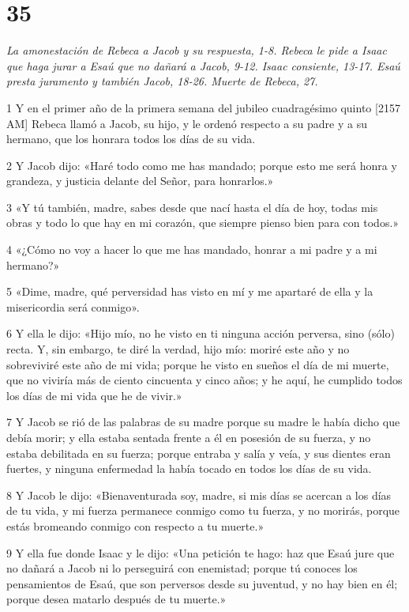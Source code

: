 \chapter{35}

\par \textit{La amonestación de Rebeca a Jacob y su respuesta, 1-8. Rebeca le pide a Isaac que haga jurar a Esaú que no dañará a Jacob, 9-12. Isaac consiente, 13-17. Esaú presta juramento y también Jacob, 18-26. Muerte de Rebeca, 27.}

\par 1 Y en el primer año de la primera semana del jubileo cuadragésimo quinto [2157 AM] Rebeca llamó a Jacob, su hijo, y le ordenó respecto a su padre y a su hermano, que los honrara todos los días de su vida.
\par 2 Y Jacob dijo: «Haré todo como me has mandado; porque esto me será honra y grandeza, y justicia delante del Señor, para honrarlos.»
\par 3 «Y tú también, madre, sabes desde que nací hasta el día de hoy, todas mis obras y todo lo que hay en mi corazón, que siempre pienso bien para con todos.»
\par 4 «¿Cómo no voy a hacer lo que me has mandado, honrar a mi padre y a mi hermano?»
\par 5 «Dime, madre, qué perversidad has visto en mí y me apartaré de ella y la misericordia será conmigo».
\par 6 Y ella le dijo: «Hijo mío, no he visto en ti ninguna acción perversa, sino (sólo) recta. Y, sin embargo, te diré la verdad, hijo mío: moriré este año y no sobreviviré este año de mi vida; porque he visto en sueños el día de mi muerte, que no viviría más de ciento cincuenta y cinco años; y he aquí, he cumplido todos los días de mi vida que he de vivir.»
\par 7 Y Jacob se rió de las palabras de su madre porque su madre le había dicho que debía morir; y ella estaba sentada frente a él en posesión de su fuerza, y no estaba debilitada en su fuerza; porque entraba y salía y veía, y sus dientes eran fuertes, y ninguna enfermedad la había tocado en todos los días de su vida.
\par 8 Y Jacob le dijo: «Bienaventurada soy, madre, si mis días se acercan a los días de tu vida, y mi fuerza permanece conmigo como tu fuerza, y no morirás, porque estás bromeando conmigo con respecto a tu muerte.»
\par 9 Y ella fue donde Isaac y le dijo: «Una petición te hago: haz que Esaú jure que no dañará a Jacob ni lo perseguirá con enemistad; porque tú conoces los pensamientos de Esaú, que son perversos desde su juventud, y no hay bien en él; porque desea matarlo después de tu muerte.»
